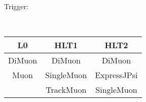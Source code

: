 Trigger:

\vspace*{0.5cm}
\mbox{~}
\begin{tabular}{|c|c|c|}
\hline
L0 & HLT1 & HLT2 \\
\hline
DiMuon& DiMuon & DiMuon \\
Muon& SingleMuon & ExpressJPsi \\
& TrackMuon & SingleMuon \\
\hline
\end{tabular}
\vspace*{0.5cm}
